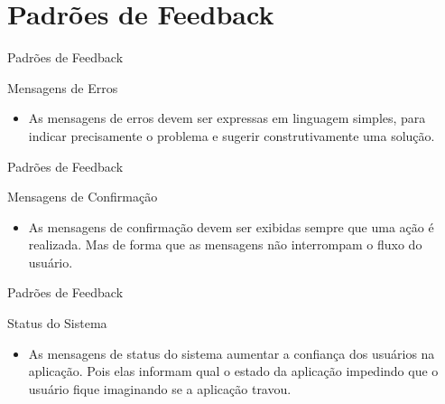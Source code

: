 \section{Padrões de Feedback}

\begin{frame}{Padrões de Feedback}
\begin{block}{Mensagens de Erros}
  \begin{itemize}
    \item<1-> As mensagens de erros devem ser expressas em linguagem simples, para indicar precisamente o problema e sugerir construtivamente uma solução. 
  \end{itemize}
\end{block}
\end{frame}

\begin{frame}{Padrões de Feedback}
\begin{block}{Mensagens de Confirmação}
  \begin{itemize}
    \item<1-> As mensagens de confirmação devem ser exibidas sempre que uma ação é realizada. Mas de forma que as mensagens não interrompam o fluxo do usuário.
  \end{itemize}
\end{block}
\end{frame}

\begin{frame}{Padrões de Feedback}
\begin{block}{Status do Sistema}
  \begin{itemize}
    \item<1-> As mensagens de status do sistema aumentar a confiança dos usuários na aplicação. Pois elas informam qual o estado da aplicação impedindo que o usuário fique imaginando se a aplicação travou.
  \end{itemize}
\end{block}
\end{frame}
